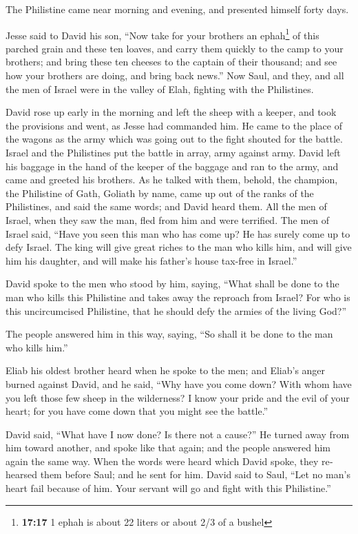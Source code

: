 \begin{paracol}{2}
\begin{otherlanguage}{english}
 The Philistine came near morning and evening, and
presented himself forty days.

 Jesse said to David his son, ``Now take for your
brothers an ephah\footnote{\textbf{17:17} 1 ephah is about 22 liters or
  about 2/3 of a bushel} of this parched grain and these ten loaves, and
carry them quickly to the camp to your brothers;  and
bring these ten cheeses to the captain of their thousand; and see how
your brothers are doing, and bring back news.''  Now
Saul, and they, and all the men of Israel were in the valley of Elah,
fighting with the Philistines.

 David rose up early in the morning and left the sheep
with a keeper, and took the provisions and went, as Jesse had commanded
him. He came to the place of the wagons as the army which was going out
to the fight shouted for the battle.  Israel and the
Philistines put the battle in array, army against army. 
David left his baggage in the hand of the keeper of the baggage and ran
to the army, and came and greeted his brothers.  As he
talked with them, behold, the champion, the Philistine of Gath, Goliath
by name, came up out of the ranks of the Philistines, and said the same
words; and David heard them.  All the men of Israel, when
they saw the man, fled from him and were terrified.  The
men of Israel said, ``Have you seen this man who has come up? He has
surely come up to defy Israel. The king will give great riches to the
man who kills him, and will give him his daughter, and will make his
father's house tax-free in Israel.''

 David spoke to the men who stood by him, saying, ``What
shall be done to the man who kills this Philistine and takes away the
reproach from Israel? For who is this uncircumcised Philistine, that he
should defy the armies of the living God?''

 The people answered him in this way, saying, ``So shall
it be done to the man who kills him.''

 Eliab his oldest brother heard when he spoke to the men;
and Eliab's anger burned against David, and he said, ``Why have you come
down? With whom have you left those few sheep in the wilderness? I know
your pride and the evil of your heart; for you have come down that you
might see the battle.''

 David said, ``What have I now done? Is there not a
cause?''  He turned away from him toward another, and
spoke like that again; and the people answered him again the same way.
 When the words were heard which David spoke, they
rehearsed them before Saul; and he sent for him.  David
said to Saul, ``Let no man's heart fail because of him. Your servant
will go and fight with this Philistine.''


\end{otherlanguage}
\end{paracol}
